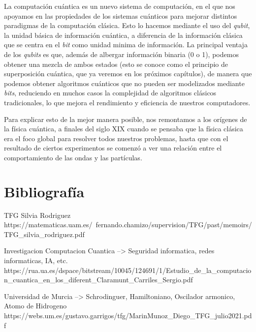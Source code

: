 \documentclass{article}
\begin{document}
    \vspace{0.5cm}

    La computación cuántica es un nuevo sistema de computación, en el que nos apoyamos en las propiedades de los sistemas cuánticos para mejorar distintos paradigmas de la computación clásica. Esto lo hacemos mediante el uso del \textit{qubit}, la unidad básica de información cuántica, a diferencia de la información clásica que se centra en el \textit{bit} como unidad minima de información. La principal ventaja de los \textit{qubits} es que, además de albergar información binaria (0 o 1), podemos obtener una mezcla de ambos estados (esto se conoce como el principio de superposición cuántica, que ya veremos en los próximos capítulos), de manera que podemos obtener algoritmos cuánticos que no pueden ser modelizados mediante \textit{bits}, reduciendo en muchos casos la complejidad de algoritmos clásicos tradicionales, lo que mejora el rendimiento y eficiencia de nuestros computadores.

    \vspace{0.5cm}

    Para explicar esto de la mejor manera posible, nos remontamos a los orígenes de la física cuántica, a finales del siglo XIX cuando se pensaba que la física clásica era el foco global para resolver todos nuestros problemas, hasta que con el resultado de ciertos experimentos se comenzó a ver una relación entre el comportamiento de las ondas y las partículas.

    \vspace{0.5cm}





    \newpage
    \thispagestyle{empty}
    \mbox{}
    \newpage

    \section{Bibliografía}

    TFG Silvia Rodriguez
    https://matematicas.uam.es/~fernando.chamizo/supervision/TFG/past/memoirs/TFG\_silvia\_rodriguez.pdf

    Investigacion Computacion Cuantica --> Seguridad informatica, redes informaticas, IA, etc.
    https://rua.ua.es/dspace/bitstream/10045/124691/1/Estudio\_de\_la\_computacion\_cuantica\_en\_los\_diferent\_Claramunt\_Carriles\_Sergio.pdf

    Universidad de Murcia --> Schrodinguer, Hamiltoniano, Oscilador armonico, Atomo de Hidrogeno
    https://webs.um.es/gustavo.garrigos/tfg/MarinMunoz\_Diego\_TFG\_julio2021.pdf
\end{document}
